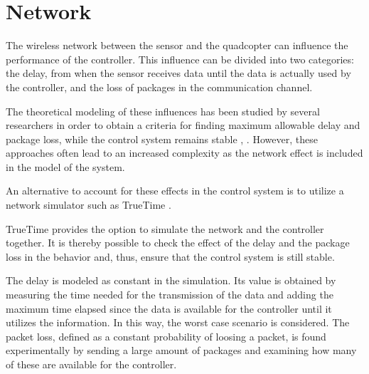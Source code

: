 \section{Network}
The wireless network between the sensor and the quadcopter can influence the performance of the controller. This influence can be divided into two categories: the delay, from when the sensor receives data until the data is actually used by the controller, and the loss of packages in the communication channel.


The theoretical modeling of these influences has been studied by several researchers in order to obtain a criteria for finding maximum allowable delay and package loss, while the control system remains stable  \cite{ling}, \cite{nirupam}. However, these approaches often lead to an increased complexity as the network effect is included in the model of the system.

An alternative to account for these effects in the control system is to utilize a network simulator such as TrueTime \cite{TrueTimeNew}.

TrueTime provides the option to simulate the network and the controller together. It is thereby possible to check the effect of the delay and the package loss in the behavior and, thus, ensure that the control system is still stable.

The delay is modeled as constant in the simulation. Its value is obtained by measuring the time needed for the transmission of the data and adding the maximum time elapsed since the data is available for the controller until it utilizes the information. In this way, the worst case scenario is considered. The packet loss, defined as a constant probability of loosing a packet, is found experimentally by sending a large amount of packages and examining how many of these are available for the controller. 
%
